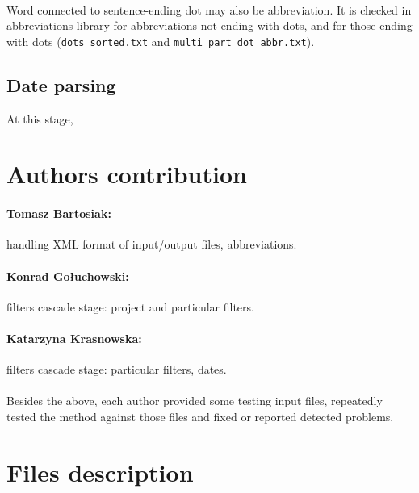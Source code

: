 \documentclass[oneside,12pt]{article}
\begin{document}
\paragraph{}
Word connected to sentence-ending dot may also be abbreviation. It is checked in abbreviations library for abbreviations not ending with dots, and for those ending with dots (\texttt{dots\_sorted.txt} and \texttt{multi\_part\_dot\_abbr.txt}).

\subsection{Date parsing}
At this stage, 

\section{Authors contribution}

\paragraph{Tomasz Bartosiak:} handling XML format of input/output files, abbreviations.

\paragraph{Konrad Gołuchowski:} filters cascade stage: project and particular filters.

\paragraph{Katarzyna Krasnowska:} filters cascade stage: particular filters, dates.

\paragraph{}
Besides the above, each author provided some testing input files, repeatedly tested the method against those files and fixed or reported detected problems. 

\section{Files description}
\end{document}
